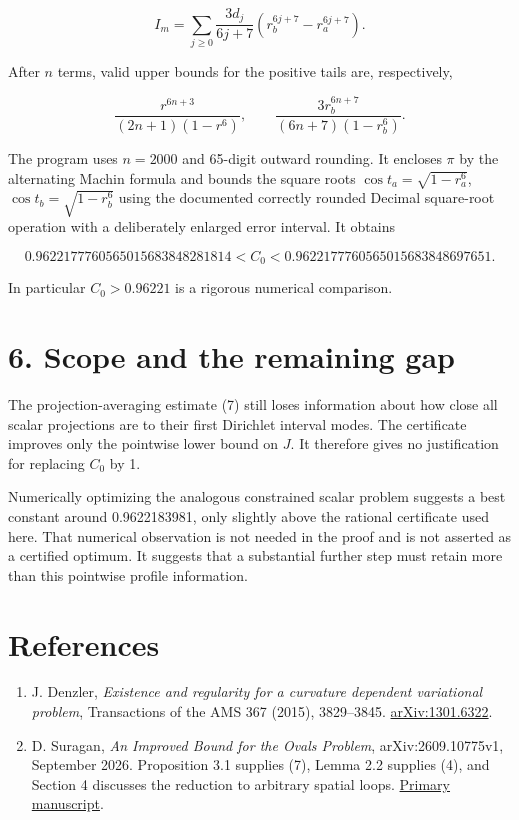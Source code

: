 \documentclass[11pt,a4paper]{article}
\providecommand{\tightlist}{\setlength{\itemsep}{0pt}\setlength{\parskip}{0pt}}
\begin{document}
\[
I_m=\sum_{j\ge0}\frac{3d_j}{6j+7}
       (r_b^{6j+7}-r_a^{6j+7}).
\tag{21}
\]

After \(n\) terms, valid upper bounds for the positive tails are,
respectively,

\[
\frac{r^{6n+3}}{(2n+1)(1-r^6)},
\qquad
\frac{3r_b^{6n+7}}{(6n+7)(1-r_b^6)}.
\tag{22}
\]

The program uses \(n=2000\) and 65-digit outward rounding. It encloses
\(\pi\) by the alternating Machin formula and bounds the square roots
\(\cos t_a=\sqrt{1-r_a^6}\), \(\cos t_b=\sqrt{1-r_b^6}\) using the
documented correctly rounded Decimal square-root operation with a
deliberately enlarged error interval. It obtains

\[
0.9622177760565015683848281814
< C_0 <
0.9622177760565015683848697651.
\tag{23}
\]

In particular \(C_0>0.96221\) is a rigorous numerical comparison.

\hypertarget{1034-scope-and-the-remaining-gap}{%
\section{6. Scope and the remaining
gap}\label{1034-scope-and-the-remaining-gap}}

The projection-averaging estimate (7) still loses information about how
close all scalar projections are to their first Dirichlet interval
modes. The certificate improves only the pointwise lower bound on \(J\).
It therefore gives no justification for replacing \(C_0\) by 1.

Numerically optimizing the analogous constrained scalar problem suggests
a best constant around 0.9622183981, only slightly above the rational
certificate used here. That numerical observation is not needed in the
proof and is not asserted as a certified optimum. It suggests that a
substantial further step must retain more than this pointwise profile
information.

\hypertarget{1034-references}{%
\section{References}\label{1034-references}}

\begin{enumerate}
\def\labelenumi{\arabic{enumi}.}
\tightlist
\item
  J. Denzler, \emph{Existence and regularity for a curvature dependent
  variational problem}, Transactions of the AMS 367 (2015), 3829--3845.
  \href{https://arxiv.org/abs/1301.6322}{arXiv:1301.6322}.
\item
  D. Suragan, \emph{An Improved Bound for the Ovals Problem},
  arXiv:2609.10775v1, September 2026. Proposition 3.1 supplies (7),
  Lemma 2.2 supplies (4), and Section 4 discusses the reduction to
  arbitrary spatial loops.
  \href{https://arxiv.org/abs/2609.10775}{Primary manuscript}.
\end{enumerate}
\end{document}
